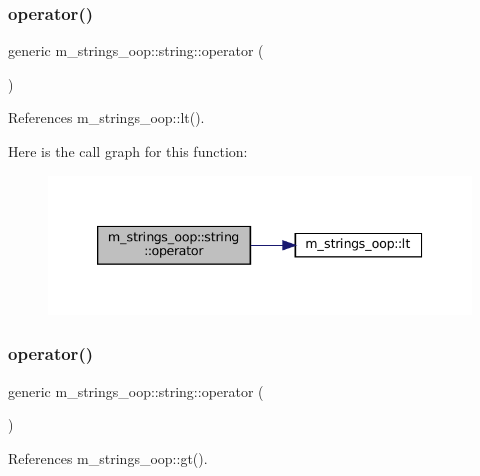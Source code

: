 \subsubsection{\texorpdfstring{operator()}{operator()}\hspace{0.1cm}{\footnotesize\ttfamily [2/10]}}
{\footnotesize\ttfamily generic m\+\_\+strings\+\_\+oop\+::string\+::operator (\begin{DoxyParamCaption}{ }\end{DoxyParamCaption})\hspace{0.3cm}{\ttfamily [private]}}



References m\+\_\+strings\+\_\+oop\+::lt().

Here is the call graph for this function\+:\nopagebreak
\begin{figure}[H]
\begin{center}
\leavevmode
\includegraphics[width=339pt]{structm__strings__oop_1_1string_a22c104099ad26ca065d7e0ddbfca7aeb_cgraph}
\end{center}
\end{figure}
\mbox{\label{structm__strings__oop_1_1string_ae1b6295dd1d93cf270435c91fa29ce01}} 
\subsubsection{\texorpdfstring{operator()}{operator()}\hspace{0.1cm}{\footnotesize\ttfamily [3/10]}}
{\footnotesize\ttfamily generic m\+\_\+strings\+\_\+oop\+::string\+::operator (\begin{DoxyParamCaption}{ }\end{DoxyParamCaption})\hspace{0.3cm}{\ttfamily [private]}}



References m\+\_\+strings\+\_\+oop\+::gt().

